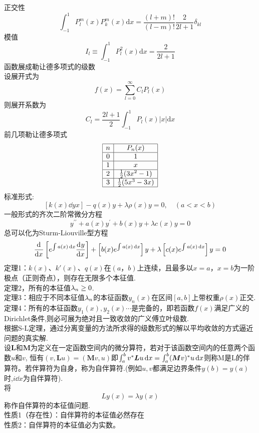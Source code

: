 \documentclass[UTF8,9pt]{ctexart}
\begin{document}
正交性
$$
\int_{-1}^{1} P_l^m(x) P_k^m(x)\mathrm dx = \frac{(l+m)!}{(l-m)!}\frac 2{2l+1}\delta_{kl}
$$
模值
$$ 
I_{l} \equiv \int_{-1}^{1} P_{l}^{2}(x) \mathrm{d} x=\frac{2}{2 l+1}
$$函数展成勒让德多项式的级数\\
设展开式为$$ 
f(x)=\sum_{l=0}^{\infty} C_{l} P_{l}(x)
$$
则展开系数为$$ 
C_{l}=\frac{2 l+1}{2} \int_{-1}^{1} P_{l}(x)|x| \mathrm{d} x
$$
前几项勒让德多项式
$$\begin{array}{|c|c|}
    \hline
    n & P_{n}(x)          \\ \hline
    0 & 1                 \\ \hline
    1 & x                 \\ \hline
    2 & \frac{1}{2}(3x^{2}-1)  \\ \hline
    3 & \frac{1}{2}(5x^{3}-3x) \\ \hline
\end{array}$$
标准形式:
$$ \left[k(x) \dd{y}{x}\right]-q(x) y+\lambda \rho(x) y=0, \quad(a<x<b)$$
一般形式的齐次二阶常微分方程
$$ 
y^{\prime \prime}+a(x) y^{\prime}+b(x) y+\lambda c(x) y=0
$$
总可以化为Sturm-Liouville型方程
$$ 
\frac{\mathrm{d}^{} }{\mathrm{d} {x}^{}}\left[e^{\int a(x) \mathop{}\!\mathrm{d} x} \frac{\mathrm{d}^{} y}{\mathrm{d} {x}^{}}\right]+\left[b(x) e^{\int a(x) \mathop{}\!\mathrm{d} x}\right] y+\lambda\left[c(x) e^{\int a(x) \mathop{}\!\mathrm{d} x}\right] y=0
$$
定理1：$k(x)$、$k'(x)$、$q(x)$在$(a，b)$上连续，且最多以$x=a$，$x=b$为一阶极点（正则奇点），则存在无限多个本征值.\\
定理2，所有的本征值$\lambda_n\geq0$.\\
定理3：相应于不同本征值$\lambda_n$的本征函数$y_n(x)$在区间$[a,b]$上带权重$\rho(x)$正交.\\
定理4：所有的本征函数$y_1(x),y_2(x)\cdots$是完备的，即若函数$f(x)$满足广义的Dirichlet条件,则必可展为绝对且一致收敛的广义傅立叶级数. \\
根据S-L定理，通过分离变量的方法所求得的级数形式的解以平均收敛的方式逼近问题的真实解.\\
设$\boldsymbol{L}$和$\boldsymbol{M}$为定义在一定函数空间内的微分算符，若对于该函数空间内的任意两个函数$u$和$v$, 恒有$(v, \boldsymbol{L} u)=(\boldsymbol{M} v, u) $即$ \int_{a}^{b} v^{*} \boldsymbol{L} u \mathop{}\!\mathrm{d} x=\int_{a}^{b}(\boldsymbol{M} v)^{*} u \mathop{}\!\mathrm{d} x$则称M是L的伴算符。若伴算符为自身，称为自伴算符.(例如$u,v$都满足边界条件$y(b)=y(a)$时,$i\dd{}{x}$为自伴算符).\\
将$$L y(x)=\lambda y(x)$$称作自伴算符的本征值问题. \\
性质1（存在性）：自伴算符的本征值必然存在\\
性质2：自伴算符的本征值必为实数。 \\
\end{document}
